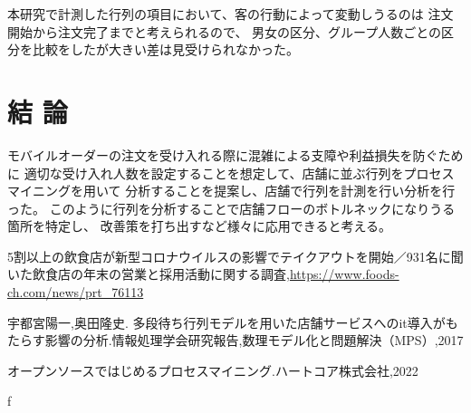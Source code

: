 \documentclass[10pt,twocolumn, a4j]{jsarticle}
\begin{document}
本研究で計測した行列の項目において、客の行動によって変動しうるのは
注文開始から注文完了までと考えられるので、
男女の区分、グループ人数ごとの区分を比較をしたが大きい差は見受けられなかった。


\section{結 論}
モバイルオーダーの注文を受け入れる際に混雑による支障や利益損失を防ぐために
適切な受け入れ人数を設定することを想定して、店舗に並ぶ行列をプロセスマイニングを用いて
分析することを提案し、店舗で行列を計測を行い分析を行った。
このように行列を分析することで店舗フローのボトルネックになりうる箇所を特定し、
改善策を打ち出すなど様々に応用できると考える。



\begin{thebibliography}{1}

  5割以上の飲食店が新型コロナウイルスの影響でテイクアウトを開始／931名に聞いた飲食店の年末の営業と採用活動に関する調査,\url{https://www.foods-ch.com/news/prt_76113}

  宇都宮陽一,奥田隆史. 多段待ち行列モデルを用いた店舗サービスへのit導入がもたらす影響の分析.情報処理学会研究報告,数理モデル化と問題解決（MPS）,2017 

  オープンソースではじめるプロセスマイニング.ハートコア株式会社,2022


\end{thebibliography}
f





\end{document}
